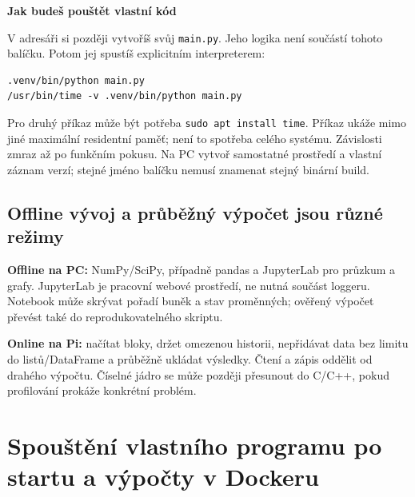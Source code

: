 \documentclass[11pt,a4paper]{article}
\newcommand{\krok}[1]{\par\noindent\textbf{#1}\par}
\begin{document}
\krok{Jak budeš pouštět vlastní kód}
V adresáři si později vytvoříš svůj \texttt{main.py}. Jeho logika není součástí tohoto balíčku. Potom jej spustíš explicitním interpreterem:
\begin{lstlisting}
.venv/bin/python main.py
/usr/bin/time -v .venv/bin/python main.py
\end{lstlisting}
Pro druhý příkaz může být potřeba \texttt{sudo apt install time}. Příkaz ukáže mimo jiné maximální residentní paměť; není to spotřeba celého systému. Závislosti zmraz až po funkčním pokusu. Na PC vytvoř samostatné prostředí a vlastní záznam verzí; stejné jméno balíčku nemusí znamenat stejný binární build.

\subsection{Offline vývoj a průběžný výpočet jsou různé režimy}
\textbf{Offline na PC:} NumPy/SciPy, případně pandas a JupyterLab pro průzkum a grafy. JupyterLab je pracovní webové prostředí, ne nutná součást loggeru. Notebook může skrývat pořadí buněk a stav proměnných; ověřený výpočet převést také do reprodukovatelného skriptu.\cite{jupyter}

\textbf{Online na Pi:} načítat bloky, držet omezenou historii, nepřidávat data bez limitu do listů/DataFrame a průběžně ukládat výsledky. Čtení a zápis oddělit od drahého výpočtu. Číselné jádro se může později přesunout do C/C++, pokud profilování prokáže konkrétní problém.

\clearpage
\section{Spouštění vlastního programu po startu a výpočty v Dockeru}
\end{document}
